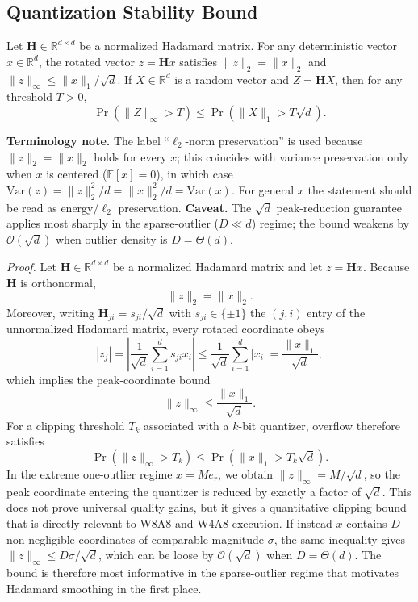\subsection{Quantization Stability Bound}

\begin{theorem}
\label{thm:quant}
Let \(\mathbf{H} \in \mathbb{R}^{d \times d}\) be a normalized Hadamard matrix. For any deterministic vector $x\in\mathbb{R}^d$, the rotated vector $z=\mathbf{H}x$ satisfies $\|z\|_2=\|x\|_2$ and $\|z\|_\infty\le \|x\|_1/\sqrt{d}$. If $X\in\mathbb{R}^d$ is a random vector and $Z=\mathbf{H}X$, then for any threshold $T>0$,
\[
\Pr(\|Z\|_\infty > T) \le \Pr(\|X\|_1 > T\sqrt{d}).
\]
\end{theorem}
\noindent\textbf{Terminology note.} The label ``$\ell_2$-norm preservation'' is used because $\|z\|_2=\|x\|_2$ holds for every $x$; this coincides with variance preservation only when $x$ is centered ($\mathbb{E}[x]=0$), in which case $\mathrm{Var}(z)=\|z\|_2^2/d=\|x\|_2^2/d=\mathrm{Var}(x)$. For general $x$ the statement should be read as energy/$\ell_2$ preservation.
\noindent\textbf{Caveat.} The $\sqrt{d}$ peak-reduction guarantee applies most sharply in the sparse-outlier ($D \ll d$) regime; the bound weakens by $\mathcal{O}(\sqrt{d})$ when outlier density is $D{=}\Theta(d)$.

\noindent\textit{Proof.} Let \(\mathbf{H} \in \mathbb{R}^{d \times d}\) be a normalized Hadamard matrix and let \(z = \mathbf{H}x\). Because \(\mathbf{H}\) is orthonormal,
\[
\|z\|_2 = \|x\|_2.
\]
Moreover, writing $\mathbf{H}_{ji} = s_{ji}/\sqrt{d}$ with $s_{ji}\in\{\pm 1\}$ the $(j,i)$ entry of the unnormalized Hadamard matrix, every rotated coordinate obeys
\[
|z_j| = \left|\frac{1}{\sqrt{d}} \sum_{i=1}^{d} s_{ji} x_i\right| \le \frac{1}{\sqrt{d}} \sum_{i=1}^{d} |x_i| = \frac{\|x\|_1}{\sqrt{d}},
\]
which implies the peak-coordinate bound
\[
\|z\|_\infty \le \frac{\|x\|_1}{\sqrt{d}}.
\]
For a clipping threshold \(T_k\) associated with a \(k\)-bit quantizer, overflow therefore satisfies
\[
\Pr\!\left(\|z\|_\infty > T_k\right) \le \Pr\!\left(\|x\|_1 > T_k \sqrt{d}\right).
\]
In the extreme one-outlier regime \(x = M e_r\), we obtain \(\|z\|_\infty = M / \sqrt{d}\), so the peak coordinate entering the quantizer is reduced by exactly a factor of \(\sqrt{d}\). This does not prove universal quality gains, but it gives a quantitative clipping bound that is directly relevant to W8A8 and W4A8 execution.
If instead \(x\) contains \(D\) non-negligible coordinates of comparable magnitude \(\sigma\), the same inequality gives \(\|z\|_\infty \le D\sigma/\sqrt{d}\), which can be loose by \(\mathcal{O}(\sqrt{d})\) when \(D=\Theta(d)\). The bound is therefore most informative in the sparse-outlier regime that motivates Hadamard smoothing in the first place.

